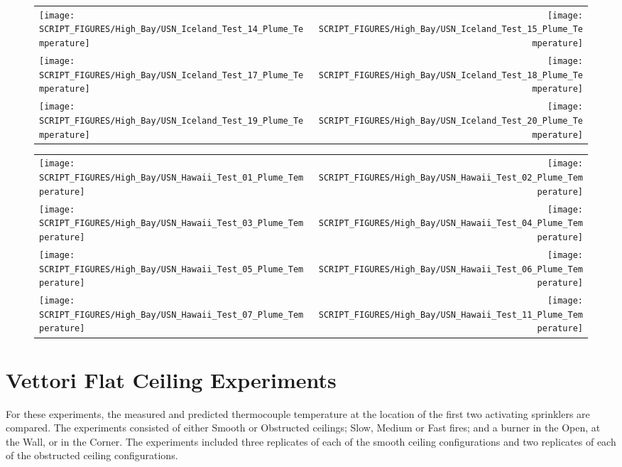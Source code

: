 \begin{figure}[p]
\begin{tabular*}{\textwidth}{l@{\extracolsep{\fill}}r}
\texttt{[image: SCRIPT\_FIGURES/High\_Bay/USN\_Iceland\_Test\_14\_Plume\_Temperature]} &
\texttt{[image: SCRIPT\_FIGURES/High\_Bay/USN\_Iceland\_Test\_15\_Plume\_Temperature]} \\
\texttt{[image: SCRIPT\_FIGURES/High\_Bay/USN\_Iceland\_Test\_17\_Plume\_Temperature]} &
\texttt{[image: SCRIPT\_FIGURES/High\_Bay/USN\_Iceland\_Test\_18\_Plume\_Temperature]} \\
\texttt{[image: SCRIPT\_FIGURES/High\_Bay/USN\_Iceland\_Test\_19\_Plume\_Temperature]} &
\texttt{[image: SCRIPT\_FIGURES/High\_Bay/USN\_Iceland\_Test\_20\_Plume\_Temperature]} \\
\end{tabular*}
\label{USN_Plume_Iceland_3}
\end{figure}

\begin{figure}[p]
\begin{tabular*}{\textwidth}{l@{\extracolsep{\fill}}r}
\texttt{[image: SCRIPT\_FIGURES/High\_Bay/USN\_Hawaii\_Test\_01\_Plume\_Temperature]} &
\texttt{[image: SCRIPT\_FIGURES/High\_Bay/USN\_Hawaii\_Test\_02\_Plume\_Temperature]} \\
\texttt{[image: SCRIPT\_FIGURES/High\_Bay/USN\_Hawaii\_Test\_03\_Plume\_Temperature]} &
\texttt{[image: SCRIPT\_FIGURES/High\_Bay/USN\_Hawaii\_Test\_04\_Plume\_Temperature]} \\
\texttt{[image: SCRIPT\_FIGURES/High\_Bay/USN\_Hawaii\_Test\_05\_Plume\_Temperature]} &
\texttt{[image: SCRIPT\_FIGURES/High\_Bay/USN\_Hawaii\_Test\_06\_Plume\_Temperature]} \\
\texttt{[image: SCRIPT\_FIGURES/High\_Bay/USN\_Hawaii\_Test\_07\_Plume\_Temperature]} &
\texttt{[image: SCRIPT\_FIGURES/High\_Bay/USN\_Hawaii\_Test\_11\_Plume\_Temperature]}
\end{tabular*}
\label{USN_Plume_Hawaii}
\end{figure}

\clearpage

\section{Vettori Flat Ceiling Experiments}
\label{Vettori_Flat_Results}

For these experiments, the measured and predicted thermocouple temperature at the location of the first two activating sprinklers are compared. The experiments consisted of either Smooth or Obstructed ceilings; Slow, Medium or Fast fires; and a burner in the Open, at the Wall, or in the Corner. The experiments included three replicates of each of the smooth ceiling configurations and two replicates of each of the obstructed ceiling configurations.


